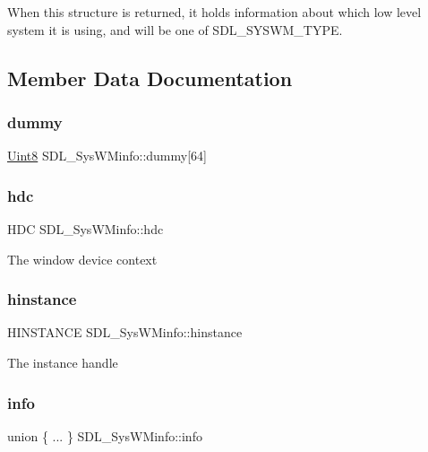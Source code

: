 When this structure is returned, it holds information about which low level system it is using, and will be one of S\+D\+L\+\_\+\+S\+Y\+S\+W\+M\+\_\+\+T\+Y\+PE. 

\subsection{Member Data Documentation}
\mbox{\label{struct_s_d_l___sys_w_minfo_a0e7fc58b98ae8317076e763fa94bc41f}} 
\subsubsection{\texorpdfstring{dummy}{dummy}}
{\footnotesize\ttfamily \mbox{\hyperlink{_s_d_l__stdinc_8h_a2944638813a090aa23e62f4da842c3e2}{Uint8}} S\+D\+L\+\_\+\+Sys\+W\+Minfo\+::dummy\mbox{[}64\mbox{]}}

\mbox{\label{struct_s_d_l___sys_w_minfo_a5c9d0745b083422834681e99c38b803e}} 
\subsubsection{\texorpdfstring{hdc}{hdc}}
{\footnotesize\ttfamily H\+DC S\+D\+L\+\_\+\+Sys\+W\+Minfo\+::hdc}

The window device context \mbox{\label{struct_s_d_l___sys_w_minfo_ae3e93d21e2b20b2069f5f7d5308194f1}} 
\subsubsection{\texorpdfstring{hinstance}{hinstance}}
{\footnotesize\ttfamily H\+I\+N\+S\+T\+A\+N\+CE S\+D\+L\+\_\+\+Sys\+W\+Minfo\+::hinstance}

The instance handle \mbox{\label{struct_s_d_l___sys_w_minfo_a701ee50042cda557e599a8a70772563e}} 
\subsubsection{\texorpdfstring{info}{info}}
{\footnotesize\ttfamily union \{ ... \}   S\+D\+L\+\_\+\+Sys\+W\+Minfo\+::info}

